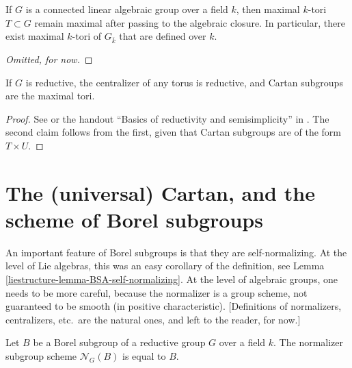 \begin{theorem}
\label{theorem-maximal-tori-exist}
If $G$ is a connected linear algebraic group over a field $k$, then maximal $k$-tori $T\subset G$ remain maximal after passing to the algebraic closure. In particular, there exist maximal $k$-tori of $G_{\bar k}$ that are defined over $k$.
\end{theorem}

\begin{proof}
 [Omitted, for now]
\end{proof}




\begin{proposition}
\label{proposition-Cartan-reductive}
If $G$ is reductive, the centralizer of any torus is reductive, and Cartan subgroups are the maximal tori. 
\end{proposition}

\begin{proof}
See \cite[\S 13.17, Corollary 2]{Borel-LAG} or the handout ``Basics of reductivity and semisimplicity'' in \cite{Conrad-AG2}. The second claim follows from the first, given that Cartan subgroups are of the form $T\times U$.
\end{proof}


\section{The (universal) Cartan, and the scheme of Borel subgroups}
\label{section-universal-Cartan}



An important feature of Borel subgroups is that they are self-normalizing. At the level of Lie algebras, this was an easy corollary of the definition, see Lemma \ref{liestructure-lemma-BSA-self-normalizing}. At the level of algebraic groups, one needs to be more careful, because the normalizer is a group scheme, not guaranteed to be smooth (in positive characteristic). [Definitions of normalizers, centralizers, etc.\ are the natural ones, and left to the reader, for now.]


\begin{theorem}
 \label{theorem-Borel-self-normalizing}
Let $B$ be a Borel subgroup of a reductive group $G$ over a field $k$. The normalizer subgroup scheme $\mathcal N_G(B)$ is equal to $B$. 
\end{theorem}

